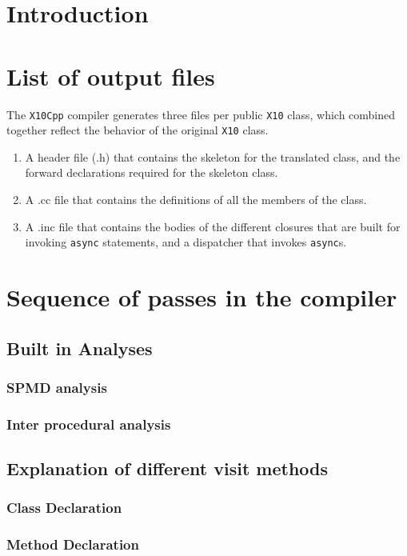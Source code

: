 \documentclass{article}
\def\XCPP{\mbox{\tt X10Cpp}}
\def\Xten{\mbox{\tt X10}}
\def\async{\mbox{\tt async}}
\begin{document}
\section{Introduction}
\section{List of output files}
The \XCPP{} compiler generates three files per public \Xten{} class, which
combined together reflect the behavior of the original \Xten{} class. 
\begin{enumerate}
\item A header file (.h) that contains the skeleton for the translated class, and the
forward declarations required for the skeleton class.

\item A .cc file that contains the definitions of all the members of the
class.

\item A .inc file that contains the bodies of the different closures that
are built for invoking \async{} statements, and a dispatcher that invokes \async{}s.
\end{enumerate}
\section{Sequence of passes in the compiler}
\subsection{Built in Analyses}
\subsubsection{SPMD analysis}
\subsubsection{Inter procedural analysis}
\subsection{Explanation of different visit methods}
\subsubsection{Class Declaration}
\subsubsection{Method Declaration}
\end{document}
